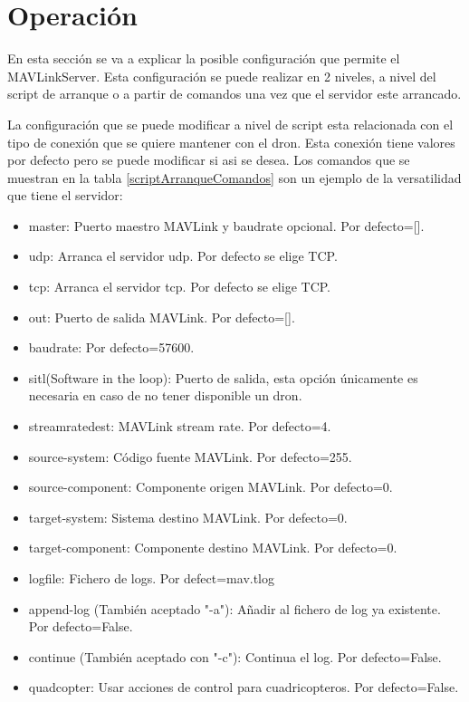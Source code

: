 \section{Operación}
\label{operacion}
En esta sección se va a explicar la posible configuración que permite el MAVLinkServer. Esta configuración se puede realizar en 2 niveles, a nivel del script de arranque o a partir de comandos una vez que el servidor este arrancado.

La configuración que se puede modificar a nivel de script esta relacionada con el tipo de conexión que se quiere mantener con el dron. Esta conexión tiene valores por defecto pero se puede modificar si asi se desea. Los comandos que se muestran en la tabla \ref{scriptArranqueComandos} son un ejemplo de la versatilidad que tiene el servidor:

\begin{multicols}{2}
\begin{itemize}
\label{scriptArranqueComandos}
\item master: Puerto maestro MAVLink y baudrate opcional. Por defecto=[].
\item udp: Arranca el servidor udp. Por defecto se elige TCP.
\item tcp: Arranca el servidor tcp. Por defecto se elige TCP.
\item out: Puerto de salida MAVLink. Por defecto=[].
\item baudrate: Por defecto=57600.
\item sitl(Software in the loop): Puerto de salida, esta opción únicamente es necesaria en caso de no tener disponible un dron.
\item streamratedest: MAVLink stream rate. Por defecto=4.
\item source-system: Código fuente MAVLink. Por defecto=255.
\item source-component: Componente origen MAVLink. Por defecto=0.
\item target-system: Sistema destino MAVLink. Por defecto=0.
\item target-component: Componente destino MAVLink. Por defecto=0.
\item logfile: Fichero de logs. Por defect=mav.tlog
\item append-log (También aceptado "-a"): Añadir al fichero de log ya existente. Por defecto=False.
\item continue (También aceptado con "-c"): Continua el log. Por defecto=False.
\item quadcopter: Usar acciones de control para cuadricopteros. Por defecto=False.

\end{itemize}
\end{multicols}

